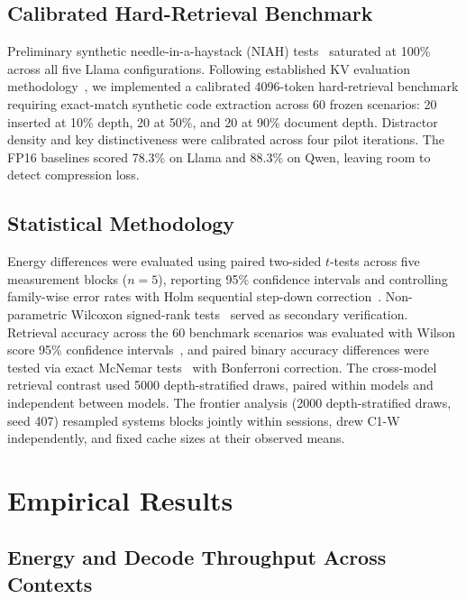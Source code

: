 \documentclass[conference,a4paper]{IEEEtran}
\begin{document}
\subsection{Calibrated Hard-Retrieval Benchmark}
\label{sec:benchmark}
Preliminary synthetic needle-in-a-haystack (NIAH) tests~\cite{kamradt2023needle} saturated at 100\% across all five Llama configurations. Following established KV evaluation methodology~\cite{cai_pyramidkv_2025,li_snapkv_2024,zhang_h2o_2023}, we implemented a calibrated 4096-token hard-retrieval benchmark requiring exact-match synthetic code extraction across 60 frozen scenarios: 20 inserted at 10\% depth, 20 at 50\%, and 20 at 90\% document depth. Distractor density and key distinctiveness were calibrated across four pilot iterations. The FP16 baselines scored 78.3\% on Llama and 88.3\% on Qwen, leaving room to detect compression loss.

\subsection{Statistical Methodology}
Energy differences were evaluated using paired two-sided $t$-tests across five measurement blocks ($n=5$), reporting 95\% confidence intervals and controlling family-wise error rates with Holm sequential step-down correction~\cite{holm1979simple}. Non-parametric Wilcoxon signed-rank tests~\cite{wilcoxon1945individual} served as secondary verification. Retrieval accuracy across the 60 benchmark scenarios was evaluated with Wilson score 95\% confidence intervals~\cite{wilson1927probable}, and paired binary accuracy differences were tested via exact McNemar tests~\cite{mcnemar1947note} with Bonferroni correction. The cross-model retrieval contrast used 5000 depth-stratified draws, paired within models and independent between models. The frontier analysis (2000 depth-stratified draws, seed 407) resampled systems blocks jointly within sessions, drew C1-W independently, and fixed cache sizes at their observed means.

\section{Empirical Results}

\subsection{Energy and Decode Throughput Across Contexts}
\label{sec:energy-scaling}
\end{document}

